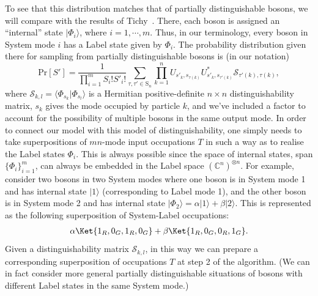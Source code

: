 To see that this distribution matches that of partially distinguishable bosons, we will compare with the results of Tichy~\cite{tichy2015}.
There, each boson is assigned an ``internal'' state $|\Phi_i\rangle$, where $i=1, \cdots, m$.
Thus, in our terminology, every boson in System mode $i$ has a Label state given by $\Phi_i$.
The probability distribution given there for sampling from partially distinguishable bosons is (in our notation)
\begin{equation}\label{eq:TichyDist}
\textrm{Pr}[S'] =  \frac{1}{\prod_{i=1}^m S_i! S'_i!} \sum_{\tau, \tau' \in \textrm{S}_n} \prod_{k=1}^n U_{s'_k,s_{\tau(k)}} U^\ast_{s'_k,s_{{\tau'}(k)}} \mathcal{S}_{{\tau'(k)},{\tau(k)}},
\end{equation}
where $\mathcal{S}_{k,l} = \langle \Phi_{s_k}|\Phi_{s_l}\rangle$ is a Hermitian positive-definite $n \times n$ distinguishability matrix, $s_k$ gives the mode occupied by particle $k$, and we've included a factor to account for the possibility of multiple bosons in the same output mode.
In order to connect our model with this model of distinguishability, one simply needs to take superpositions of $mn$-mode input occupations $T$ in such a way as to realise the Label states $\Phi_i$.
This is always possible since the space of internal states, span$\{\Phi_i\}_{i=1}^m$, can always be embedded in the Label space $(\mathbb{C}^n)^{\otimes n}$.
For example, consider two bosons in two System modes where one boson is in System mode 1 and has internal state $|1\rangle$ (corresponding to Label mode 1), and the other boson is in System mode 2 and has internal state $|\Phi_2\rangle=\alpha|1\rangle+\beta|2\rangle$.
This is represented as the following superposition of System-Label occupations:
\begin{align}
\alpha \Ket{1_R, 0_G, 1_R, 0_G} + \beta \Ket{1_R, 0_G, 0_R, 1_G} .
\end{align}
Given a distinguishability matrix $\mathcal{S}_{k,l}$, in this way we can prepare a corresponding superposition of occupations $T$ at step 2 of the algorithm.
(We can in fact consider more general partially distinguishable situations of bosons with different Label states in the same System mode.)

